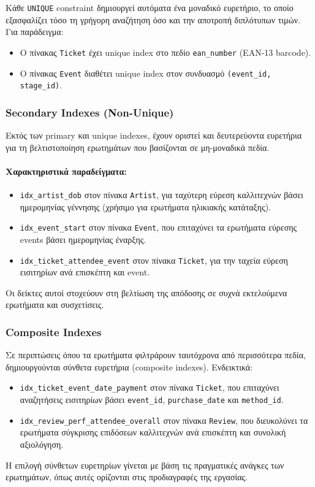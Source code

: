 \documentclass[13pt]{extarticle}
\begin{document}
Κάθε \texttt{UNIQUE} constraint δημιουργεί αυτόματα ένα μοναδικό ευρετήριο, το οποίο εξασφαλίζει τόσο τη γρήγορη αναζήτηση όσο και την αποτροπή διπλότυπων τιμών. Για παράδειγμα:
\begin{itemize}
    \item Ο πίνακας \texttt{Ticket} έχει unique index στο πεδίο \texttt{ean\_number} (EAN-13 barcode).
    \item Ο πίνακας \texttt{Event} διαθέτει unique index στον συνδυασμό \texttt{(event\_id, stage\_id)}.
\end{itemize}

\subsubsection{Secondary Indexes (Non-Unique)}

Εκτός των primary και unique indexes, έχουν οριστεί και δευτερεύοντα ευρετήρια για τη βελτιστοποίηση ερωτημάτων που βασίζονται σε μη-μοναδικά πεδία.

\paragraph{Χαρακτηριστικά παραδείγματα:}
\begin{itemize}
    \item \texttt{idx\_artist\_dob} στον πίνακα \texttt{Artist}, για ταχύτερη εύρεση καλλιτεχνών βάσει ημερομηνίας γέννησης (χρήσιμο για ερωτήματα ηλικιακής κατάταξης).
    \item \texttt{idx\_event\_start} στον πίνακα \texttt{Event}, που επιταχύνει τα ερωτήματα εύρεσης events βάσει ημερομηνίας έναρξης.
    \item \texttt{idx\_ticket\_attendee\_event} στον πίνακα \texttt{Ticket}, για την ταχεία εύρεση εισιτηρίων ανά επισκέπτη και event.
\end{itemize}
Οι δείκτες αυτοί στοχεύουν στη βελτίωση της απόδοσης σε συχνά εκτελούμενα ερωτήματα και συσχετίσεις.

\subsubsection{Composite Indexes}

Σε περιπτώσεις όπου τα ερωτήματα φιλτράρουν ταυτόχρονα από περισσότερα πεδία, δημιουργούνται σύνθετα ευρετήρια (composite indexes). Ενδεικτικά:
\begin{itemize}
    \item \texttt{idx\_ticket\_event\_date\_payment} στον πίνακα \texttt{Ticket}, που επιταχύνει αναζητήσεις εισιτηρίων βάσει \texttt{event\_id}, \texttt{purchase\_date} και \texttt{method\_id}.
    \item \texttt{idx\_review\_perf\_attendee\_overall} στον πίνακα \texttt{Review}, που διευκολύνει τα ερωτήματα σύγκρισης επιδόσεων καλλιτεχνών ανά επισκέπτη και συνολική αξιολόγηση.
\end{itemize}
Η επιλογή σύνθετων ευρετηρίων γίνεται με βάση τις πραγματικές ανάγκες των ερωτημάτων, όπως αυτές ορίζονται στις προδιαγραφές της εργασίας.
\end{document}
